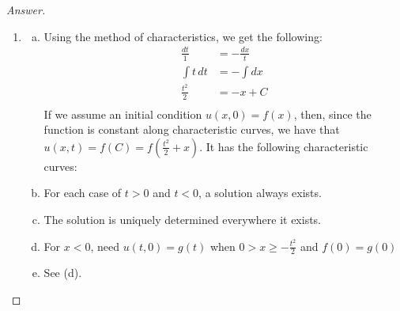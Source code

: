 \documentclass{article}
\theoremstyle{definition}
\renewcommand\qedsymbol{$\blacksquare$}
\newenvironment{ans}{\begin{proof}[Answer]\renewcommand{\qedsymbol}{}}{\end{proof}}
\begin{document}
\begin{ans}
\begin{enumerate}[(1), series=answers]
			\item \begin{enumerate}[a)]
                    \item Using the method of characteristics, we get the following: 
				\begin{align*}
					\frac{dt}{1} &= -\frac{dx}{t}\\
					\int t\, dt &= -\int dx\\
					\frac{t^2}{2} &= -x + C\\
				\end{align*}
			If we assume an initial condition $u(x, 0) = f(x)$, then, since the function is constant along characteristic curves, we have that $\boxed{u(x, t) = f(C) = f(\frac{t^2}{2} + x)}$. It has the following characteristic curves:

                    \begin{center}
                    \end{center}
                    
                    \item For each case of $t > 0$ and $t < 0$, a solution always exists.

                    \item The solution is uniquely determined everywhere it exists.

                    \item For $x < 0$, need $u(t, 0) = g(t)$ when $0 > x \geq - \frac{t^2}{2}$ and $f(0) = g(0)$

                    \item See (d).

                \end{enumerate}
			

\end{enumerate}
\end{ans}
\end{document}
